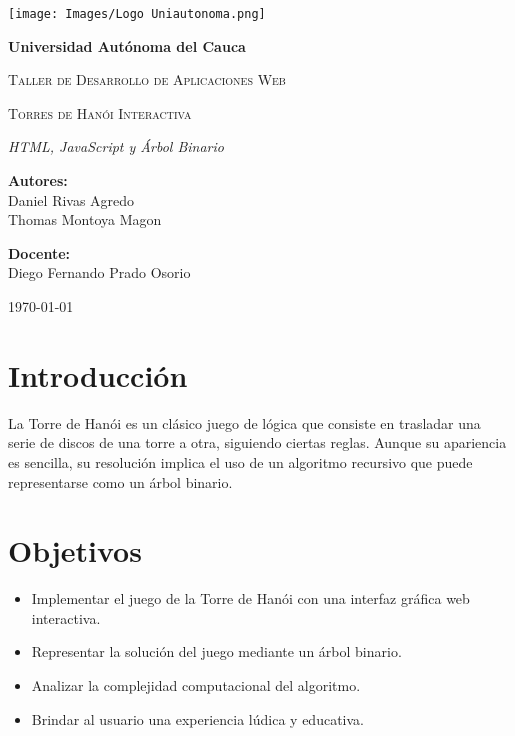 \documentclass{article}
\begin{document}
\begin{titlepage}
\centering
\texttt{[image: Images/Logo Uniautonoma.png]}\par
\vspace{1cm}
{\bfseries\LARGE Universidad Autónoma del Cauca\par}
\vspace{0.5cm}
{\scshape\Large Taller de Desarrollo de Aplicaciones Web\par}
\vspace{0.5cm}
{\scshape\Huge Torres de Hanói Interactiva\par}
\vspace{1cm}
{\itshape\LARGE HTML, JavaScript y Árbol Binario\par}
\vspace{1.5cm}
{\Large \textbf{Autores:} \\ Daniel Rivas Agredo \\ Thomas Montoya Magon \par}
\vspace{0.5cm}
{\Large \textbf{Docente:} \\ Diego Fernando Prado Osorio\par}
\vfill
{\Large \today \par}
\end{titlepage}

\tableofcontents
\clearpage

\section{Introducción}
La Torre de Hanói es un clásico juego de lógica que consiste en trasladar una serie de discos de una torre a otra, siguiendo ciertas reglas. Aunque su apariencia es sencilla, su resolución implica el uso de un algoritmo recursivo que puede representarse como un árbol binario.

\section{Objetivos}
\begin{itemize}
    \item Implementar el juego de la Torre de Hanói con una interfaz gráfica web interactiva.
    \item Representar la solución del juego mediante un árbol binario.
    \item Analizar la complejidad computacional del algoritmo.
    \item Brindar al usuario una experiencia lúdica y educativa.
\end{itemize}
\end{document}
